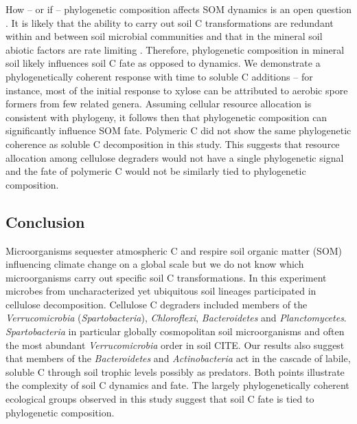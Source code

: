 How -- or if -- phylogenetic composition affects SOM dynamics is an open
question \citep{Schimel_2012}. It is likely that the ability to carry out soil
C transformations are redundant within and between soil microbial communities
and that in the mineral soil abiotic factors are rate limiting
\citep{Schimel_2012}. Therefore, phylogenetic composition in mineral soil
likely influences soil C fate as opposed to dynamics. We demonstrate
a phylogenetically coherent response with time to soluble C additions -- for
instance, most of the initial response to xylose can be attributed to aerobic
spore formers from few related genera. Assuming cellular resource allocation is
consistent with phylogeny, it follows then that phylogenetic composition can
significantly influence SOM fate. Polymeric C did not show the same
phylogenetic coherence as soluble C decomposition in this study. This suggests
that resource allocation among cellulose degraders would not have a single
phylogenetic signal and the fate of polymeric C would not be similarly tied to
phylogenetic composition.

\subsection{Conclusion} 
Microorganisms sequester atmospheric C and respire soil organic matter (SOM)
influencing climate change on a global scale but we do not know which
microorganisms carry out specific soil C transformations. In this experiment
microbes from uncharacterized yet ubiquitous soil lineages
participated in cellulose decomposition. Cellulose C degraders included members
of the \textit{Verrucomicrobia} (\textit{Spartobacteria}),
\textit{Chloroflexi}, \textit{Bacteroidetes} and \textit{Planctomycetes}.
\textit{Spartobacteria} in particular globally cosmopolitan soil microorganisms
and often the most abundant \textit{Verrucomicrobia} order in soil CITE. Our
results also suggest that members of the \textit{Bacteroidetes} and
\textit{Actinobacteria} act in the cascade of labile, soluble C through soil
trophic levels possibly as predators. Both points illustrate the complexity of
soil C dynamics and fate. The largely phylogenetically coherent ecological
groups observed in this study suggest that soil C fate is tied to phylogenetic
composition.
